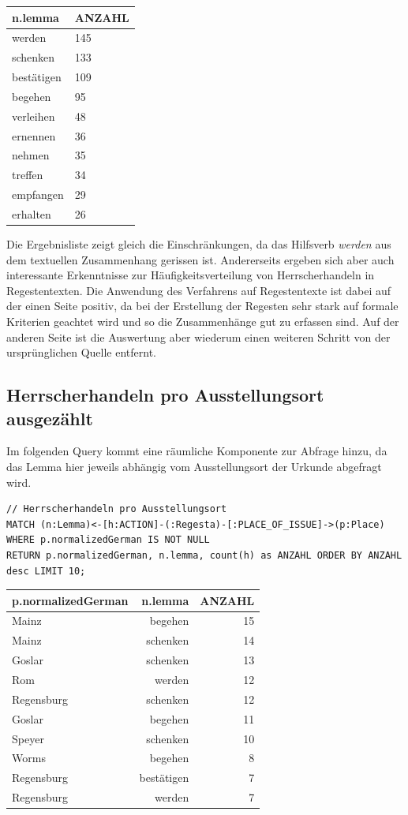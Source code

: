 \documentclass[ngerman,]{scrreprt}
\begin{document}
\begin{longtable}[]{@{}ll@{}}
\toprule
n.lemma & ANZAHL\tabularnewline
\midrule
\endhead
werden & 145\tabularnewline
schenken & 133\tabularnewline
bestätigen & 109\tabularnewline
begehen & 95\tabularnewline
verleihen & 48\tabularnewline
ernennen & 36\tabularnewline
nehmen & 35\tabularnewline
treffen & 34\tabularnewline
empfangen & 29\tabularnewline
erhalten & 26\tabularnewline
\bottomrule
\end{longtable}

Die Ergebnisliste zeigt gleich die Einschränkungen, da das Hilfsverb \emph{werden} aus dem textuellen Zusammenhang gerissen ist. Andererseits ergeben sich aber auch interessante Erkenntnisse zur Häufigkeitsverteilung von Herrscherhandeln in Regestentexten. Die Anwendung des Verfahrens auf Regestentexte ist dabei auf der einen Seite positiv, da bei der Erstellung der Regesten sehr stark auf formale Kriterien geachtet wird und so die Zusammenhänge gut zu erfassen sind. Auf der anderen Seite ist die Auswertung aber wiederum einen weiteren Schritt von der ursprünglichen Quelle entfernt.

\subsection{Herrscherhandeln pro Ausstellungsort ausgezählt}\label{herrscherhandeln-pro-ausstellungsort-ausgezuxe4hlt}

Im folgenden Query kommt eine räumliche Komponente zur Abfrage hinzu, da das Lemma hier jeweils abhängig vom Ausstellungsort der Urkunde abgefragt wird.

\begin{verbatim}
// Herrscherhandeln pro Ausstellungsort
MATCH (n:Lemma)<-[h:ACTION]-(:Regesta)-[:PLACE_OF_ISSUE]->(p:Place)
WHERE p.normalizedGerman IS NOT NULL
RETURN p.normalizedGerman, n.lemma, count(h) as ANZAHL ORDER BY ANZAHL desc LIMIT 10;
\end{verbatim}

\begin{longtable}[]{@{}lrr@{}}
\toprule
p.normalizedGerman & n.lemma & ANZAHL\tabularnewline
\midrule
\endhead
Mainz & begehen & 15\tabularnewline
Mainz & schenken & 14\tabularnewline
Goslar & schenken & 13\tabularnewline
Rom & werden & 12\tabularnewline
Regensburg & schenken & 12\tabularnewline
Goslar & begehen & 11\tabularnewline
Speyer & schenken & 10\tabularnewline
Worms & begehen & 8\tabularnewline
Regensburg & bestätigen & 7\tabularnewline
Regensburg & werden & 7\tabularnewline
\bottomrule
\end{longtable}
\end{document}
